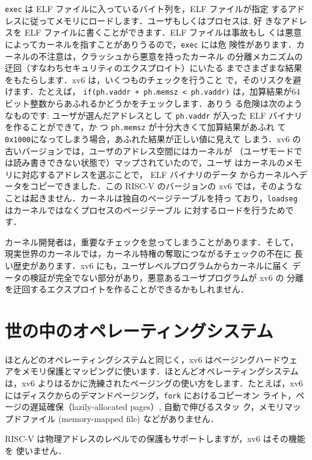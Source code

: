 \lstinline{exec} は ELF ファイルに入っているバイト列を，ELF ファイルが指定
するアドレスに従ってメモリにロードします．ユーザもしくはプロセスは, 好
きなアドレスを ELF ファイルに書くことができます．ELF ファイルは事故もし
くは悪意によってカーネルを指すことがありうるので，\lstinline{exec} には危
険性があります．カーネルの不注意は，クラッシュから悪意を持ったカーネル
の分離メカニズムの迂回（すなわちセキュリティのエクスプロイト）にいたる
までさまざまな結果をもたらします．xv6 は，いくつものチェックを行うこと
で，そのリスクを避けます．たとえば，
%
\lstinline{if(ph.vaddr + ph.memsz < ph.vaddr)} 
%
は，加算結果が64ビット整数からあふれるかどうかをチェックします．ありう
る危険は次のようなものです: ユーザが選んだアドレスとし
て \lstinline{ph.vaddr} が入った ELF バイナリを作ることができて，か
つ \lstinline{ph.memsz} が十分大きくて加算結果があふれ
て \lstinline{0x1000}になってしまう場合，あふれた結果が正しい値に見えて
しまう．xv6 の古いバージョンでは，ユーザのアドレス空間にはカーネルが
（ユーザモードでは読み書きできない状態で）マップされていたので，ユーザ
はカーネルのメモリに対応するアドレスを選ぶことで， ELF バイナリのデータ
からカーネルへデータをコピーできました．この RISC-V のバージョンの xv6
では，そのようなことは起きません．カーネルは独自のページテーブルを持っ
ており，\lstinline{loadseg} はカーネルではなくプロセスのページテーブル
に対するロードを行うためです．

カーネル開発者は，重要なチェックを怠ってしまうことがあります．そして，
現実世界のカーネルでは，カーネル特権の奪取につながるチェックの不在に
長い歴史があります．xv6 にも，ユーザレベルプログラムからカーネルに届く
データの検証が完全でない部分があり，悪意あるユーザプログラムが xv6 の
分離を迂回するエクスプロイトを作ることができるかもしれません．

\section{世の中のオペレーティングシステム}

ほとんどのオペレーティングシステムと同じく，xv6 はページングハードウェ
アをメモリ保護とマッピングに使います．ほとんどオペレーティングシステム
は，xv6 よりはるかに洗練されたページングの使い方をします．たとえば，xv6
にはディスクからのデマンドページング，\texttt{fork} におけるコピーオン
ライト，ページの遅延確保（lazily-allocated pages）, 自動で伸びるスタッ
ク，メモリマップドファイル (memory-mapped file) などがありません．

RISC-V は物理アドレスのレベルでの保護もサポートしますが，xv6 はその機能を
使いません．


